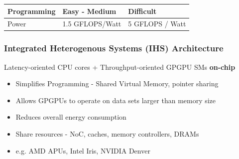 \documentclass{beamer}
\begin{document}
\begin{frame}
\begin{table}[]
\begin{tabular}{@{}lll@{}}
	Programming                                                           & Easy - Medium                                                                                    & Difficult                                                                                     \\ \midrule
	Power                                                                 & 1.5 GFLOPS/Watt                                                                                  & 5 GFLOPS / Watt                                                                               \\ \bottomrule
\end{tabular}
\label{cpu-vs-gpu}
\end{table}
\end{frame}


\begin{frame}
\frametitle{Integrated Heterogenous Systems (IHS) Architecture}
Latency-oriented CPU cores + Throughput-oriented GPGPU SMs \textbf{on-chip} \\
\begin{itemize}
	\item Simplifies Programming - Shared Virtual Memory, pointer sharing
	\item Allows GPGPUs to operate on data sets larger than memory size %
	\item Reduces overall energy consumption
	\item Share resources - NoC, caches, memory controllers, DRAMs
	\item e.g. AMD APUs, Intel Iris, NVIDIA Denver
\end{itemize}
\begin{figure}[!htb]
	\centering
	\def\svgwidth{0.6\columnwidth}
	
	\label{fig:hsa-arch}
\end{figure}
\end{frame}
\end{document}
